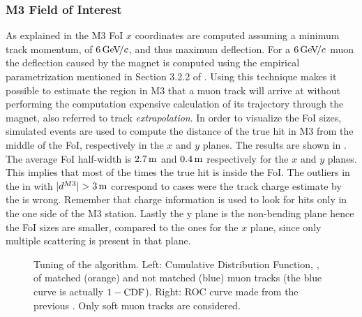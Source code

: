 \subsubsection{M3 Field of Interest}
As explained in  the M3 FoI $x$ coordinates are computed assuming a minimum track momentum, of $6{\mathrm{\,Ge\kern -0.1em V\!/}c}$,
and thus maximum deflection. For a $6{\mathrm{\,Ge\kern -0.1em V\!/}c}$ muon the deflection caused by the \lhcb magnet is computed using the empirical
parametrization mentioned in Section 3.2.2 of \cite{roelThesis}. Using this technique makes it possible to estimate the region
in M3 that a muon track will arrive at without performing the computation
expensive calculation of its trajectory through the \lhcb magnet, also referred to track {\it extrapolation}. In order to visualize the FoI sizes,
simulated events are used to compute the distance of the true hit in M3 from the middle of the FoI, respectively in the $x$ and $y$ planes.
The results are shown in . The average FoI half-width is $2.7\rm \,m$ and $0.4\rm \,m$ respectively for the $x$ and $y$ planes.
This implies that most of the times the true hit is inside the FoI. The outliers in the  in with $|d^{M3}|>3\m$
correspond to cases were the track charge estimate by the \ttracker is wrong. Remember that charge information is used to
look for hits only in the one side of the M3 station. Lastly the y plane is the non-bending plane hence the FoI sizes
are smaller, compared to the ones for the $x$ plane, since only multiple scattering is present in that plane.

\begin{figure}[t]
  \centering
  \begin{subfigure}{0.5\textwidth}
    \raggedright
    \scalebox{0.55}{}
    \caption{}
    \label{mvm_cdf}
  \end{subfigure}%
  \hfill%
  \begin{subfigure}{0.5\textwidth}
    \raggedleft
    \scalebox{0.55}{}
    \caption{}
    \label{mvm_roc}
  \end{subfigure}
  \caption{Tuning of the \mvTTm algorithm. Left: \chisq Cumulative Distribution Function, \cdf,
           of matched (orange) and not matched (blue) muon tracks (the blue curve is actually $1-\mbox{CDF}$).
           Right: ROC curve made from the previous \chisq \cdf. Only soft muon tracks are considered. }
 \label{mvm_tuning}
\end{figure}

